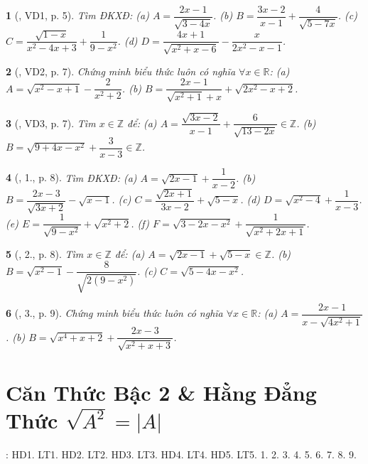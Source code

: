 \documentclass{article}
\newtheorem{baitoan}{}%
\begin{document}
\begin{baitoan}[\cite{Thu_Viet_Minh_ptb2}, VD1, p. 5]
	Tìm {\rm ĐKXĐ}: (a) $A = \dfrac{2x - 1}{\sqrt{3 - 4x}}$. (b) $B = \dfrac{3x - 2}{x - 1} + \dfrac{4}{\sqrt{5 - 7x}}$. (c) $C = \dfrac{\sqrt{1 - x}}{x^2 - 4x + 3} + \dfrac{1}{9 - x^2}$. (d) $D = \dfrac{4x + 1}{\sqrt{x^2 + x - 6}} - \dfrac{x}{2x^2 - x - 1}$.
\end{baitoan}

\begin{baitoan}[\cite{Thu_Viet_Minh_ptb2}, VD2, p. 7]
	Chứng minh biểu thức luôn có nghĩa $\forall x\in\mathbb{R}$: (a) $A = \sqrt{x^2 - x + 1} - \dfrac{2}{x^2 + 2}$. (b) $B = \dfrac{2x - 1}{\sqrt{x^2 + 1} + x} + \sqrt{2x^2 - x + 2}$.
\end{baitoan}

\begin{baitoan}[\cite{Thu_Viet_Minh_ptb2}, VD3, p. 7]
	Tìm $x\in\mathbb{Z}$ để: (a) $A = \dfrac{\sqrt{3x - 2}}{x - 1} + \dfrac{6}{\sqrt{13 - 2x}}\in\mathbb{Z}$. (b) $B = \sqrt{9 + 4x - x^2} + \dfrac{3}{x - 3}\in\mathbb{Z}$.
\end{baitoan}

\begin{baitoan}[\cite{Thu_Viet_Minh_ptb2}, 1., p. 8]
	Tìm {\rm ĐKXĐ}: (a) $A = \sqrt{2x - 1} + \dfrac{1}{x - 2}$. (b) $B = \dfrac{2x - 3}{\sqrt{3x + 2}} - \sqrt{x - 1}$. (c) $C = \dfrac{\sqrt{2x + 1}}{3x - 2} + \sqrt{5 - x}$. (d) $D = \sqrt{x^2 - 4} + \dfrac{1}{x - 3}$. (e) $E = \dfrac{1}{\sqrt{9 - x^2}} + \sqrt{x^2 + 2}$. (f) $F = \sqrt{3 - 2x - x^2} + \dfrac{1}{\sqrt{x^2 + 2x + 1}}$.
\end{baitoan}

\begin{baitoan}[\cite{Thu_Viet_Minh_ptb2}, 2., p. 8]
	Tìm $x\in\mathbb{Z}$ để: (a) $A = \sqrt{2x - 1} + \sqrt{5 - x}\in\mathbb{Z}$. (b) $B = \sqrt{x^2 - 1} - \dfrac{8}{\sqrt{2(9 - x^2)}}$. (c) $C = \sqrt{5 - 4x - x^2}$.
\end{baitoan}

\begin{baitoan}[\cite{Thu_Viet_Minh_ptb2}, 3., p. 9]
	Chứng minh biểu thức luôn có nghĩa $\forall x\in\mathbb{R}$: (a) $A = \dfrac{2x - 1}{x - \sqrt{4x^2 + 1}}$. (b) $B = \sqrt{x^4 + x + 2} + \dfrac{2x - 3}{\sqrt{x^2 + x + 3}}$.
\end{baitoan}


\section{Căn Thức Bậc 2 \& Hằng Đẳng Thức $\sqrt{A^2} = |A|$}
\cite[Chap. III, \S2, pp. 55--60]{SGK_Toan_9_Canh_Dieu_tap_1}: HD1. LT1. HD2. LT2. HD3. LT3. HD4. LT4. HD5. LT5. 1. 2. 3. 4. 5. 6. 7. 8. 9.
\end{document}
